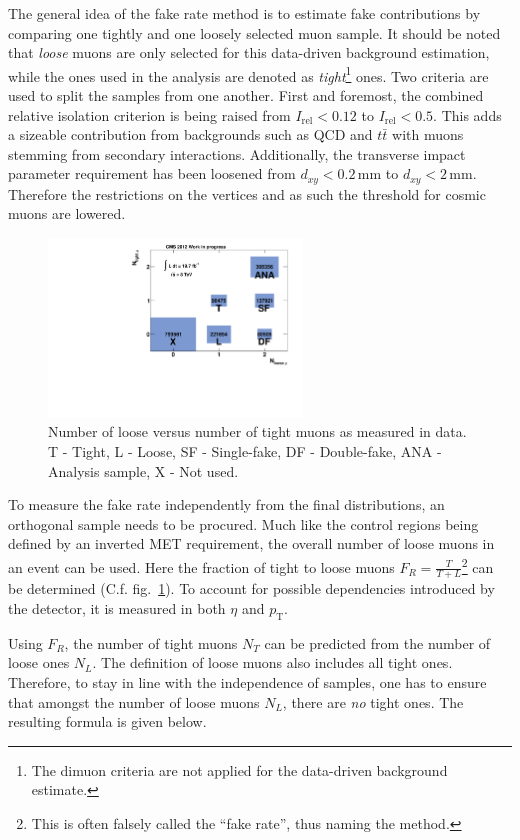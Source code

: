 The general idea of the fake rate method is to estimate fake contributions by comparing one tightly and one loosely selected muon sample. It should be noted that \textit{loose} muons are only selected for this data-driven background estimation, while the ones used in the analysis are denoted as \textit{tight}\footnote{The dimuon criteria are not applied for the data-driven background estimate.} ones. Two criteria are used to split the samples from one another. First and foremost, the combined relative isolation criterion is being raised from $I_{\text{rel}} < 0.12$ to $I_{\text{rel}} < 0.5$. This adds a sizeable contribution from backgrounds such as QCD and $t \bar{t}$ with muons stemming from secondary interactions. Additionally, the transverse impact parameter requirement has been loosened from $d_{xy} < 0.2\,\text{mm}$ to $d_{xy} < 2\,\text{mm}$. Therefore the restrictions on the vertices and as such the threshold for cosmic muons are lowered.

\begin{figure}[ht!]
  \centering
    \includegraphics[width=0.6\textwidth]{plots/nloosetight.pdf}
  \caption{Number of loose versus number of tight muons as measured in data. T - Tight, L - Loose, SF - Single-fake, DF - Double-fake, ANA - Analysis sample, X - Not used.}
  \label{fig:nloosetight}
\end{figure}

To measure the fake rate independently from the final distributions, an orthogonal sample needs to be procured. Much like the control regions being defined by an inverted MET requirement, the overall number of loose muons in an event can be used. Here the fraction of tight to loose muons $F_R = \frac{T}{T+L}$\footnote{This is often falsely called the ``fake rate'', thus naming the method.} can be determined (C.f. fig.~\ref{fig:nloosetight}). To account for possible dependencies introduced by the detector, it is measured in both $\eta$ and $p_{\text{T}}$. 

Using $F_R$, the number of tight muons $N_T$ can be predicted from the number of loose ones $N_L$. The definition of loose muons also includes all tight ones. Therefore, to stay in line with the independence of samples, one has to ensure that amongst the number of loose muons $N_L$, there are \textit{no} tight ones. The resulting formula is given below.


